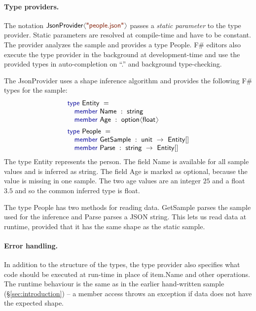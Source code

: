 \documentclass[10pt,preprint,clearpagebib]{sigplanconf}
\newcommand{\langl}{\begin{picture}(4.5,7)
\put(1.1,2.5){\rotatebox{60}{\line(1,0){5.5}}}
\put(1.1,2.5){\rotatebox{300}{\line(1,0){5.5}}}
\end{picture}}
\newcommand{\rangl}{\begin{picture}(4.5,7)
\put(.9,2.5){\rotatebox{120}{\line(1,0){5.5}}}
\put(.9,2.5){\rotatebox{240}{\line(1,0){5.5}}}
\end{picture}}
\newcommand{\kvd}[1]{\textnormal{\textcolor{kvdclr}{\sffamily #1}}}
\newcommand{\str}[1]{\textnormal{\textcolor{strclr}{\sffamily "#1"}}}
\newcommand{\ident}[1]{\textnormal{\sffamily #1}}
\begin{document}
\paragraph{Type providers.}
The notation $\ident{JsonProvider}\langl\str{people.json}\rangl$ passes a \emph{static parameter} 
to the type provider. Static parameters are resolved at compile-time and have to be constant. 
The provider analyzes the sample and provides a type  \ident{People}. F\# editors also 
execute the type provider in the background at development-time and use the provided types 
in auto-completion on ``.'' and background type-checking.

The \ident{JsonProvider} uses a shape inference algorithm and provides
the following F\# types for the sample:
%
\begin{equation*}
\begin{array}{l}
 \kvd{type}~\ident{Entity}~=  \\
 \quad \kvd{member}~\ident{Name}~:~\ident{string} \\
 \quad \kvd{member}~\ident{Age}~:~\ident{option}\langl \ident{float}\rangl \\[0.5em]
 \kvd{type}~\ident{People}~=  \\
 \quad \kvd{member}~\ident{GetSample}~:~\ident{unit}~\rightarrow~\ident{Entity}[] \\
 \quad \kvd{member}~\ident{Parse}~:~\ident{string}~\rightarrow~\ident{Entity}[] \\
\end{array}
\end{equation*}
%
The type \ident{Entity} represents the person. The field \ident{Name} is available for all
sample values and is inferred as \ident{string}. The field \ident{Age} is marked as optional,
because the value is missing in one sample. The two age values are an integer $25$ and a 
float $3.5$ and so the common inferred type is \ident{float}.

The type \ident{People} has two methods for reading data. \ident{GetSample} parses the
sample used for the inference and \ident{Parse} parses a JSON string. This lets us read
data at runtime, provided that it has the same shape as the static sample.

\paragraph{Error handling.}
In addition to the structure of the types, the type provider also specifies what code should be 
executed at run-time in place of \ident{item.Name} and other operations. The runtime behaviour is 
the same as in the earlier hand-written sample (\S\ref{sec:introduction}) -- a member access 
throws an exception if data does not have the expected shape.
\end{document}
